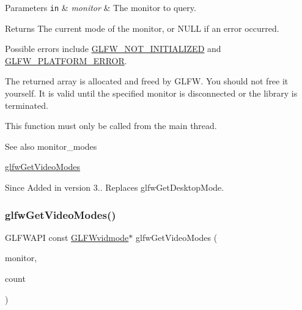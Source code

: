 \begin{DoxyParams}[1]{Parameters}
\mbox{\tt in}  & {\em monitor} & The monitor to query. \\
\hline
\end{DoxyParams}
\begin{DoxyReturn}{Returns}
The current mode of the monitor, or {\ttfamily N\+U\+LL} if an error occurred.
\end{DoxyReturn}
Possible errors include \hyperlink{group__errors_ga2374ee02c177f12e1fa76ff3ed15e14a}{G\+L\+F\+W\+\_\+\+N\+O\+T\+\_\+\+I\+N\+I\+T\+I\+A\+L\+I\+Z\+ED} and \hyperlink{group__errors_gad44162d78100ea5e87cdd38426b8c7a1}{G\+L\+F\+W\+\_\+\+P\+L\+A\+T\+F\+O\+R\+M\+\_\+\+E\+R\+R\+OR}.

The returned array is allocated and freed by G\+L\+FW. You should not free it yourself. It is valid until the specified monitor is disconnected or the library is terminated.

This function must only be called from the main thread.

\begin{DoxySeeAlso}{See also}
monitor\+\_\+modes 

\hyperlink{group__monitor_ga811c28d61595e630774389985947c665}{glfw\+Get\+Video\+Modes}
\end{DoxySeeAlso}
\begin{DoxySince}{Since}
Added in version 3.. Replaces {\ttfamily glfw\+Get\+Desktop\+Mode}. 
\end{DoxySince}
\mbox{\label{group__monitor_ga811c28d61595e630774389985947c665}} 
\subsubsection{\texorpdfstring{glfw\+Get\+Video\+Modes()}{glfwGetVideoModes()}}
{\footnotesize\ttfamily G\+L\+F\+W\+A\+PI const \hyperlink{struct_g_l_f_wvidmode}{G\+L\+F\+Wvidmode}$\ast$ glfw\+Get\+Video\+Modes (\begin{DoxyParamCaption}\item[{\hyperlink{group__monitor_ga8d9efd1cde9426692c73fe40437d0ae3}{G\+L\+F\+Wmonitor} $\ast$}]{monitor,  }\item[{int $\ast$}]{count }\end{DoxyParamCaption})}



